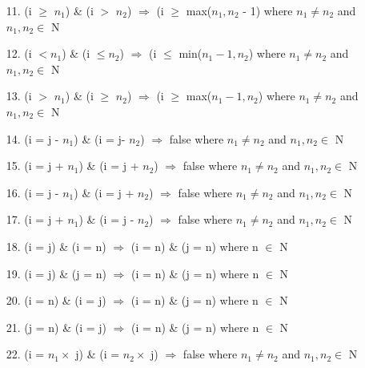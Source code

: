 \documentclass{article}
\begin{document}
\begin{itemize}
	\item[11.] (i $\geq$ $n_1$) \& (i $>$ $n_2$) $\Rightarrow$ (i $\geq$ max($n_1, n_2$ - 1) where $n_1 \neq n_2$ and $n_1, n_2 \in$ N
	
	\item[12.] (i $< n_1$) \& (i $\leq n_2$) $\Rightarrow$ (i $\leq$ min($n_1-1, n_2$) where $n_1 \neq n_2$ and $n_1, n_2 \in$ N
	
	\item[13.] (i $>$ $n_1$) \& (i $\geq$ $n_2$) $\Rightarrow$ (i $\geq$ max($n_1-1, n_2$) where $n_1 \neq n_2$ and $n_1, n_2 \in$ N
	
	
	\item[14.] (i = j - $n_1$) \& (i = j- $n_2$) $\Rightarrow$ false where $n_1 \neq n_2$ and $n_1, n_2 \in$ N
	
	\item[15.] (i = j + $n_1$) \& (i = j + $n_2$) $\Rightarrow$ false where $n_1 \neq n_2$ and $n_1, n_2 \in$ N
	
	\item[16.] (i = j - $n_1$) \& (i = j + $n_2$) $\Rightarrow$ false where $n_1 \neq n_2$ and $n_1, n_2 \in$ N
	
	\item[17.] (i = j + $n_1$) \& (i = j - $n_2$) $\Rightarrow$ false where $n_1 \neq n_2$ and $n_1, n_2 \in$ N
	
	\item[18.] (i = j) \& (i = n) $\Rightarrow$ (i = n) \& (j = n) where n $\in$ N
	
	\item[19.] (i = j) \& (j = n) $\Rightarrow$ (i = n) \& (j = n) where n $\in$ N
	
	\item[20.] (i = n) \& (i = j) $\Rightarrow$ (i = n) \& (j = n) where n $\in$ N
	
	\item[21.] (j = n) \& (i = j) $\Rightarrow$ (i = n) \& (j = n) where n $\in$ N
	
	\item[22.] (i = $n_1 \times$ j) \& (i = $n_2 \times$ j) $\Rightarrow$ false where $n_1 \neq n_2$ and $n_1, n_2 \in$ N
	
\end{itemize}
\end{document}
